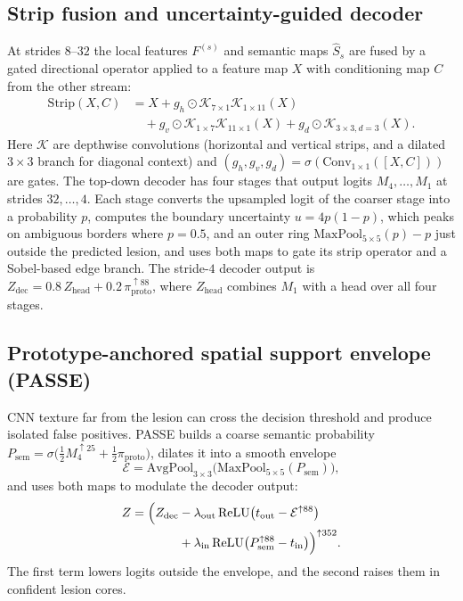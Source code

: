 \documentclass[10pt,twocolumn]{article}
\begin{document}
\subsection{Strip fusion and uncertainty-guided decoder}
At strides $8$--$32$ the local features $F^{(s)}$ and semantic maps $\hat S_s$ are fused by a gated directional operator applied to a feature map $X$ with conditioning map $C$ from the other stream:
\begin{align}
  \mathrm{Strip}(X,C) &= X+g_h\odot\mathcal{K}_{7\times1}\mathcal{K}_{1\times11}(X)\nonumber\\
  &\quad +g_v\odot\mathcal{K}_{1\times7}\mathcal{K}_{11\times1}(X)+g_d\odot\mathcal{K}_{3\times3,d=3}(X).
  \label{eq:stripssm}
\end{align}
Here $\mathcal{K}$ are depthwise convolutions (horizontal and vertical strips, and a dilated $3\times3$ branch for diagonal context) and $(g_h,g_v,g_d)=\sigma(\mathrm{Conv}_{1\times1}([X,C]))$ are gates. The top-down decoder has four stages that output logits $M_4,\dots,M_1$ at strides $32,\dots,4$. Each stage converts the upsampled logit of the coarser stage into a probability $p$, computes the boundary uncertainty $u=4p(1-p)$, which peaks on ambiguous borders where $p=0.5$, and an outer ring $\mathrm{MaxPool}_{5\times5}(p)-p$ just outside the predicted lesion, and uses both maps to gate its strip operator and a Sobel-based edge branch. The stride-$4$ decoder output is $Z_{\text{dec}}=0.8\,Z_{\text{head}}+0.2\,\pi_{\text{proto}}^{\uparrow88}$, where $Z_{\text{head}}$ combines $M_1$ with a head over all four stages.

\subsection{Prototype-anchored spatial support envelope (PASSE)}
CNN texture far from the lesion can cross the decision threshold and produce isolated false positives. PASSE builds a coarse semantic probability $P_{\text{sem}}=\sigma\bigl(\tfrac12 M_4^{\uparrow25}+\tfrac12\pi_{\text{proto}}\bigr)$, dilates it into a smooth envelope
\begin{equation}
  \mathcal{E}=\mathrm{AvgPool}_{3\times3}\bigl(\mathrm{MaxPool}_{5\times5}(P_{\text{sem}})\bigr),
  \label{eq:passe_env}
\end{equation}
and uses both maps to modulate the decoder output:
\begin{align}
  Z = \Bigl(Z_{\text{dec}} &-\lambda_{\text{out}}\,\mathrm{ReLU}\bigl(t_{\text{out}}-\mathcal{E}^{\uparrow88}\bigr)\nonumber\\
  &+\lambda_{\text{in}}\,\mathrm{ReLU}\bigl(P_{\text{sem}}^{\uparrow88}-t_{\text{in}}\bigr)\Bigr)^{\uparrow352}.
  \label{eq:passe_mod}
\end{align}
The first term lowers logits outside the envelope, and the second raises them in confident lesion cores.
\end{document}
